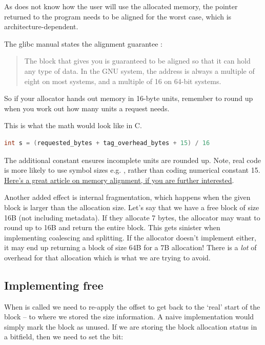 As  does not know how the user will use the allocated memory, the pointer returned to the program needs to be aligned for the worst case, which is architecture-dependent.

The glibc manual states the alignment guarantee \cite{vma_paging}:

\begin{quote}
The block that  gives you is guaranteed to be aligned so that it can hold any type of data. In the GNU system, the address is always a multiple of eight on most systems, and a multiple of 16 on 64-bit systems.
\end{quote}

So if your allocator hands out memory in 16-byte units, remember to round up when you work out how many units a request needs.

This is what the math would look like in C.

\begin{lstlisting}[language=C]
int s = (requested_bytes + tag_overhead_bytes + 15) / 16
\end{lstlisting}

The additional constant ensures incomplete units are rounded up. Note, real code is more likely to use symbol sizes e.g. , rather than coding numerical constant 15.
\href{https://web.archive.org/web/20190313121701/https://www.ibm.com/developerworks/library/pa-dalign/}{Here's a great article on memory alignment, if you are further interested}.

Another added effect is internal fragmentation, which happens when the given block is larger than the allocation size.
Let's say that we have a free block of size 16B (not including metadata).
If they allocate 7 bytes, the allocator may want to round up to 16B and return the entire block.
This gets sinister when implementing coalescing and splitting.
If the allocator doesn't implement either, it may end up returning a block of size 64B for a 7B allocation!
There is a \emph{lot} of overhead for that allocation which is what we are trying to avoid.

\subsection{Implementing free}

When  is called we need to re-apply the offset to get back to the `real' start of the block -- to where we stored the size information.
A naive implementation would simply mark the block as unused.
If we are storing the block allocation status in a bitfield, then we need to set the  bit:

